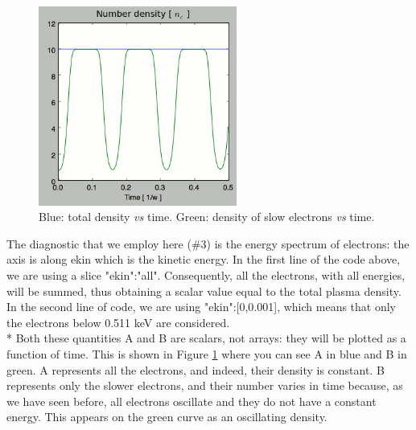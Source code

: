 \documentclass[11pt]{article}
\newcommand{\code}[1]{\colorbox{yellow!15}{\ttfamily #1}}
\begin{document}
\begin{figure}
  \centering
  \includegraphics[width=6.5cm]{ParticleDiagTutorial7}
  \caption{Blue: total density \emph{vs} time. Green: density of slow electrons \emph{vs} time.}
  \label{Tuto7}
\end{figure}
The diagnostic that we employ here (\#3) is the energy spectrum of electrons: the axis is along \code{ekin} which is the kinetic energy. In the first line of the code above, we are using a slice \code{"ekin":"all"}. Consequently, all the electrons, with all energies, will be summed, thus obtaining a scalar value equal to the total plasma density. In the second line of code, we are using \code{"ekin":[0,0.001]}, which means that only the electrons below 0.511 keV are considered.\\*
Both these quantities \code{A} and \code{B} are scalars, not arrays: they will be plotted as a function of time. This is shown in Figure \ref{Tuto7} where you can see \code{A} in blue and \code{B} in green. \code{A} represents all the electrons, and indeed, their density is constant. \code{B} represents only the slower electrons, and their number varies in time because, as we have seen before, all electrons oscillate and they do not have a constant energy. This appears on the green curve as an oscillating density.
\end{document}
